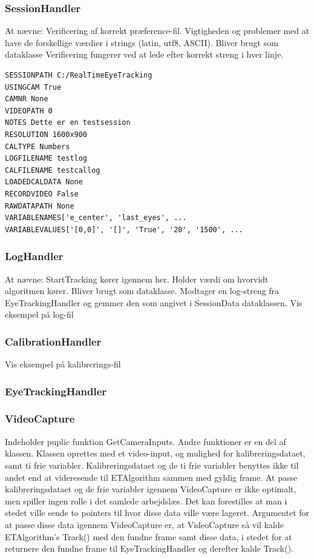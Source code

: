 \documentclass[rapport.tex]{subfiles}
\begin{document}
	\subsubsection{SessionHandler}
	At nævne: Verificering af korrekt præference-fil. Vigtigheden og problemer med at have de forskellige værdier i strings (latin, utf8, ASCII). Bliver brugt som dataklasse
	Verificering fungerer ved at lede efter korrekt streng i hver linje. \\
	
\begin{lstlisting}
SESSIONPATH C:/RealTimeEyeTracking
USINGCAM True
CAMNR None
VIDEOPATH 0
NOTES Dette er en testsession
RESOLUTION 1600x900
CALTYPE Numbers
LOGFILENAME testlog
CALFILENAME testcallog
LOADEDCALDATA None
RECORDVIDEO False
RAWDATAPATH None
VARIABLENAMES['e_center', 'last_eyes', ...
VARIABLEVALUES['[0,0]', '[]', 'True', '20', '1500', ...
\end{lstlisting}
		
	\subsubsection{LogHandler}
	At nævne: StartTracking kører igennem her. Holder værdi om hvorvidt algoritmen kører. Bliver brugt som dataklasse. 
	Modtager en log-streng fra EyeTrackingHandler og gemmer den som angivet i SessionData dataklassen. 
	Vis eksempel på log-fil
	
	\subsubsection{CalibrationHandler}
	Vis eksempel på kalibrerings-fil
	
	\subsubsection{EyeTrackingHandler}
	
	
	\subsubsection{VideoCapture}
	Indeholder puplic funktion GetCameraInputs. 
	Andre funktioner er en del af klassen. Klassen oprettes med et video-input, og mulighed for kalibreringsdataet, samt ti frie variabler. Kalibreringsdataet og de ti frie variabler benyttes ikke til andet end at videresende til ETAlgorithm sammen med gyldig frame. 
	At passe kalibreringsdataet og de frie variabler igennem VideoCapture er ikke optimalt, men spiller ingen rolle i det samlede arbejdslæs. Det kan forestilles at man i stedet ville sende to pointers til hvor disse data ville være lageret. Argumentet for at passe disse data igennem VideoCapture er, at VideoCapture så vil kalde ETAlgorithm's Track() med den fundne frame samt disse data, i stedet for at returnere den fundne frame til EyeTrackingHandler og derefter kalde Track(). 
		
\end{document}
